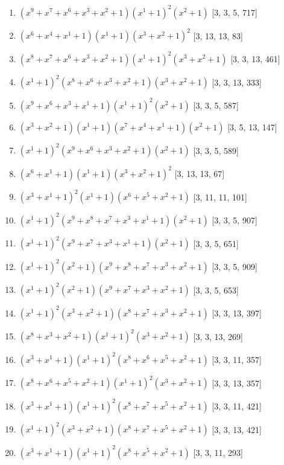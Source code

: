 \documentclass[10pt,twocolumn]{article}
\begin{document}
\begin{enumerate}
\item $(x^{9} + x^{7} + x^{6} + x^{3} + x^{2} + 1)(x^{1} + 1)^{2}(x^{2} + 1)$  [3, 3, 5, 717]
\item $(x^{6} + x^{4} + x^{1} + 1)(x^{1} + 1)(x^{3} + x^{2} + 1)^{2}$  [3, 13, 13, 83]
\item $(x^{8} + x^{7} + x^{6} + x^{3} + x^{2} + 1)(x^{1} + 1)^{2}(x^{3} + x^{2} + 1)$  [3, 3, 13, 461]
\item $(x^{1} + 1)^{2}(x^{8} + x^{6} + x^{3} + x^{2} + 1)(x^{3} + x^{2} + 1)$  [3, 3, 13, 333]
\item $(x^{9} + x^{6} + x^{3} + x^{1} + 1)(x^{1} + 1)^{2}(x^{2} + 1)$  [3, 3, 5, 587]
\item $(x^{3} + x^{2} + 1)(x^{1} + 1)(x^{7} + x^{4} + x^{1} + 1)(x^{2} + 1)$  [3, 5, 13, 147]
\item $(x^{1} + 1)^{2}(x^{9} + x^{6} + x^{3} + x^{2} + 1)(x^{2} + 1)$  [3, 3, 5, 589]
\item $(x^{6} + x^{1} + 1)(x^{1} + 1)(x^{3} + x^{2} + 1)^{2}$  [3, 13, 13, 67]
\item $(x^{3} + x^{1} + 1)^{2}(x^{1} + 1)(x^{6} + x^{5} + x^{2} + 1)$  [3, 11, 11, 101]
\item $(x^{1} + 1)^{2}(x^{9} + x^{8} + x^{7} + x^{3} + x^{1} + 1)(x^{2} + 1)$  [3, 3, 5, 907]
\item $(x^{1} + 1)^{2}(x^{9} + x^{7} + x^{3} + x^{1} + 1)(x^{2} + 1)$  [3, 3, 5, 651]
\item $(x^{1} + 1)^{2}(x^{2} + 1)(x^{9} + x^{8} + x^{7} + x^{3} + x^{2} + 1)$  [3, 3, 5, 909]
\item $(x^{1} + 1)^{2}(x^{2} + 1)(x^{9} + x^{7} + x^{3} + x^{2} + 1)$  [3, 3, 5, 653]
\item $(x^{1} + 1)^{2}(x^{3} + x^{2} + 1)(x^{8} + x^{7} + x^{3} + x^{2} + 1)$  [3, 3, 13, 397]
\item $(x^{8} + x^{3} + x^{2} + 1)(x^{1} + 1)^{2}(x^{3} + x^{2} + 1)$  [3, 3, 13, 269]
\item $(x^{3} + x^{1} + 1)(x^{1} + 1)^{2}(x^{8} + x^{6} + x^{5} + x^{2} + 1)$  [3, 3, 11, 357]
\item $(x^{8} + x^{6} + x^{5} + x^{2} + 1)(x^{1} + 1)^{2}(x^{3} + x^{2} + 1)$  [3, 3, 13, 357]
\item $(x^{3} + x^{1} + 1)(x^{1} + 1)^{2}(x^{8} + x^{7} + x^{5} + x^{2} + 1)$  [3, 3, 11, 421]
\item $(x^{1} + 1)^{2}(x^{3} + x^{2} + 1)(x^{8} + x^{7} + x^{5} + x^{2} + 1)$  [3, 3, 13, 421]
\item $(x^{3} + x^{1} + 1)(x^{1} + 1)^{2}(x^{8} + x^{5} + x^{2} + 1)$  [3, 3, 11, 293]

\end{enumerate}
\end{document}
